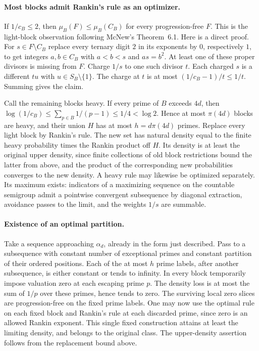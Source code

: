 \paragraph{Most blocks admit Rankin's rule as an optimizer.}
If $1/c_B\le2$, then $\mu_B(F)\le\mu_B(C_B)$ for every
progression-free $F$. This is the light-block observation following
McNew's Theorem~6.1. Here is a direct proof. For $s\in F\setminus C_B$
replace every ternary digit $2$ in its exponents by $0$, respectively
$1$, to get integers $a,b\in C_B$ with $a<b<s$ and $as=b^2$.
At least one of these proper divisors is missing from $F$. Charge
$1/s$ to one such divisor $t$. Each charged $s$ is a different
$t u$ with $u\in S_B\setminus\{1\}$. The charge at $t$ is at most
$(1/c_B-1)/t\le1/t$. Summing gives the claim.

Call the remaining blocks heavy. If every prime of $B$ exceeds $4d$,
then $\log(1/c_B)\le\sum_{p\in B}1/(p-1)\le1/4<\log 2$.
Hence at most $\pi(4d)$ blocks are heavy, and their union $H$
has at most $h=d\pi(4d)$ primes. Replace every light block by
Rankin's rule. The new set has natural density equal to the finite
heavy probability times the Rankin product off $H$. Its density is
at least the original upper density, since finite collections of
old block restrictions bound the latter from above, and the product
of the corresponding new probabilities converges to the new density.
A heavy rule may likewise be optimized separately. Its maximum exists:
indicators of a maximizing sequence on the countable semigroup admit
a pointwise convergent subsequence by diagonal extraction, avoidance
passes to the limit, and the weights $1/s$ are summable.

\paragraph{Existence of an optimal partition.}
Take a sequence approaching $\alpha_d$, already in the form just
described. Pass to a subsequence with constant number of exceptional
primes and constant partition of their ordered positions. Each of the
at most $h$ prime labels, after another subsequence, is either constant
or tends to infinity. In every block temporarily impose valuation zero
at each escaping prime $p$. The density loss is at most the sum of
$1/p$ over these primes, hence tends to zero. The surviving local
zero slices are progression-free on the fixed prime labels. One
may now use the optimal rule on each fixed block and Rankin's rule
at each discarded prime, since zero is an allowed Rankin exponent.
This single fixed construction attains at least the limiting density,
and belongs to the original class. The upper-density assertion follows
from the replacement bound above.

